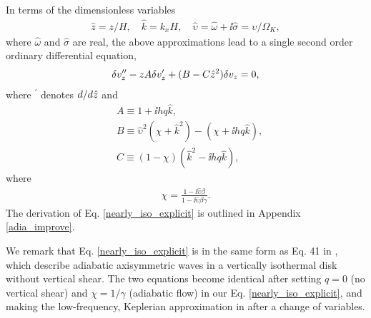  In terms of the dimensionless variables
\begin{align}
  \hat{z} = z/H,\quad \hat{k}=k_xH, \quad \hat{\upsilon} =\hat{\omega} +
  \ii\hat{\sigma}= \upsilon/\Omega_K,
\end{align}
where $\hat{\omega}$ and $\hat{\sigma}$ are real, the above
approximations lead to a single second order ordinary differential
equation, 
\begin{align}
  \delta v_z^{\prime\prime} - z A\delta v_z^\prime +
  (B - C\hat{z}^2)\delta v_z = 0,\label{nearly_iso_explicit}
\end{align}
where $^\prime$ denotes $d/d\hat{z}$ and 
\begin{align}
  &A \equiv 1 + \ii h q \hat{k},\\
  &B \equiv \hat{\upsilon}^2\left(\chi + \hat{k}^2\right) -
  \left(\chi + \ii h q \hat{k}\right),\\
  &C \equiv \left(1-\chi\right)\left(\hat{k}^2 - \ii
    h q\hat{k}\right), 
\end{align}
where
\begin{align}
\chi = \frac{1-\ii\hat{\upsilon}\beta}{1-\ii\hat{\upsilon}\beta\gamma}.
\end{align}
The derivation of Eq. \ref{nearly_iso_explicit}  is outlined in
Appendix \ref{adia_improve}. 
 
We remark that Eq. \ref{nearly_iso_explicit} is in the same 
form as Eq. 41 in \cite{lubow93}, which describe adiabatic axisymmetric waves in
a vertically isothermal disk without vertical shear. The two equations
become identical after  setting $q=0$ (no vertical shear) and
$\chi=1/\gamma$ (adiabatic flow) in our Eq. \ref{nearly_iso_explicit},
and making the low-frequency, Keplerian approximation in
\citeauthor{lubow93} after a change of variables.    

